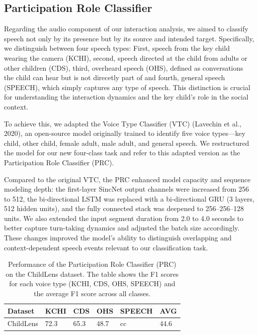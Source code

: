 \documentclass[
  man,floatsintext]{apa6}
\begin{document}
\subsection{Participation Role Classifier}\label{sup-voice-direction}

Regarding the audio component of our interaction analysis, we aimed to classify speech not only by its presence but by its source and intended target. Specifically, we distinguish between four speech types: First, speech from the key child wearing the camera (KCHI), second, speech directed at the child from adults or other children (CDS), third, overheard speech (OHS), defined as conversations the child can hear but is not direcetly part of and fourth, general speech (SPEECH), which simply captures any type of speech. This distinction is crucial for understanding the interaction dynamics and the key child's role in the social context.

To achieve this, we adapted the Voice Type Classifier (VTC) (Lavechin et al., 2020), an open-source model originally trained to identify five voice types---key child, other child, female adult, male adult, and general speech. We restructured the model for our new four-class task and refer to this adapted version as the Participation Role Classifier (PRC).

Compared to the original VTC, the PRC enhanced model capacity and sequence modeling depth: the first-layer SincNet output channels were increased from 256 to 512, the bi-directional LSTM was replaced with a bi-directional GRU (3 layers, 512 hidden units), and the fully connected stack was deepened to 256--256--128 units. We also extended the input segment duration from 2.0 to 4.0 seconds to better capture turn-taking dynamics and adjusted the batch size accordingly. These changes improved the model's ability to distinguish overlapping and context-dependent speech events relevant to our classification task.

\begin{table}[tbp]

\begin{center}
\begin{threeparttable}

\caption{\label{tab:vtc-results}Performance of the Participation Role Classifier (PRC) on the ChildLens dataset. The table shows the F1 scores for each voice type (KCHI, CDS, OHS, SPEECH) and the average F1 score across all classes.}

\begin{tabular}{llllll}
\toprule
Dataset & \multicolumn{1}{c}{KCHI} & \multicolumn{1}{c}{CDS} & \multicolumn{1}{c}{OHS} & \multicolumn{1}{c}{SPEECH} & \multicolumn{1}{c}{AVG}\\
\midrule
ChildLens & 72.3 & 65.3 & 48.7 & cc & 44.6\\
\bottomrule
\end{tabular}

\end{threeparttable}
\end{center}

\end{table}
\end{document}
